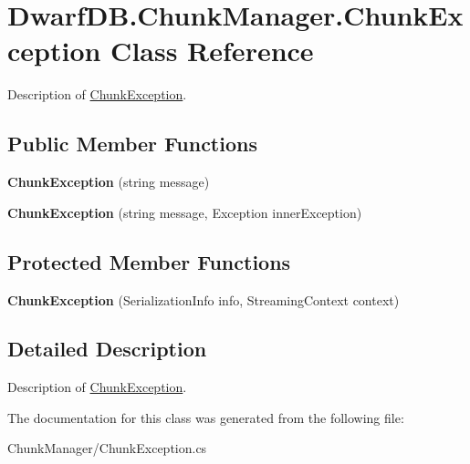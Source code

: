 \hypertarget{class_dwarf_d_b_1_1_chunk_manager_1_1_chunk_exception}{
\section{DwarfDB.ChunkManager.ChunkException Class Reference}
\label{class_dwarf_d_b_1_1_chunk_manager_1_1_chunk_exception}
}


Description of \hyperlink{class_dwarf_d_b_1_1_chunk_manager_1_1_chunk_exception}{ChunkException}.  


\subsection*{Public Member Functions}
\begin{DoxyCompactItemize}
\item 
\hypertarget{class_dwarf_d_b_1_1_chunk_manager_1_1_chunk_exception_a505308a394244643c3fed2e017f775ec}{
{\bfseries ChunkException} (string message)}
\label{class_dwarf_d_b_1_1_chunk_manager_1_1_chunk_exception_a505308a394244643c3fed2e017f775ec}

\item 
\hypertarget{class_dwarf_d_b_1_1_chunk_manager_1_1_chunk_exception_a677ad83cf99a19262d566195900ca9f3}{
{\bfseries ChunkException} (string message, Exception innerException)}
\label{class_dwarf_d_b_1_1_chunk_manager_1_1_chunk_exception_a677ad83cf99a19262d566195900ca9f3}

\end{DoxyCompactItemize}
\subsection*{Protected Member Functions}
\begin{DoxyCompactItemize}
\item 
\hypertarget{class_dwarf_d_b_1_1_chunk_manager_1_1_chunk_exception_a32ada1c2000e89dabcf22fc250e3bff4}{
{\bfseries ChunkException} (SerializationInfo info, StreamingContext context)}
\label{class_dwarf_d_b_1_1_chunk_manager_1_1_chunk_exception_a32ada1c2000e89dabcf22fc250e3bff4}

\end{DoxyCompactItemize}


\subsection{Detailed Description}
Description of \hyperlink{class_dwarf_d_b_1_1_chunk_manager_1_1_chunk_exception}{ChunkException}. 

The documentation for this class was generated from the following file:\begin{DoxyCompactItemize}
\item 
ChunkManager/ChunkException.cs\end{DoxyCompactItemize}
